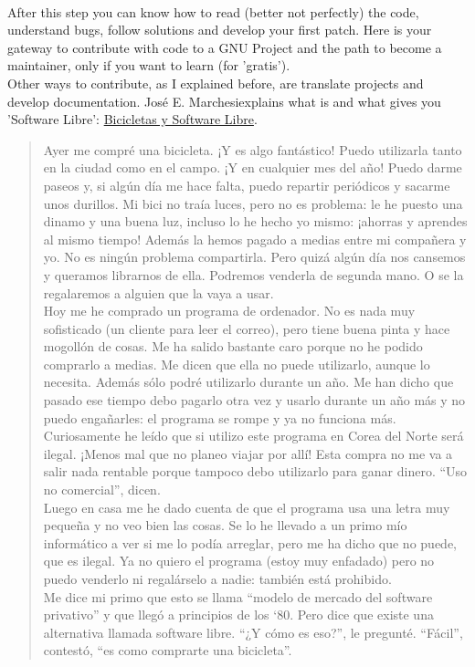 \\ After this step you can know how to read (better not perfectly) the code, understand bugs, follow solutions and develop your first patch. Here is your gateway to contribute with code to a GNU Project and the path to become a maintainer, only if you want to learn (for 'gratis').\nolinebreak
\\ Other ways to contribute, as I explained before, are translate projects and develop documentation. José E. Marchesi\nolinebreakthat explains what is and what gives you 'Software Libre': \href{http://es.gnu.org/~jemarch/bicicletas.html}{Bicicletas y Software Libre}.
\begin{quotation} Ayer me compré una bicicleta. ¡Y es algo fantástico! Puedo utilizarla tanto en la ciudad como en el campo. ¡Y en cualquier mes del año! Puedo darme paseos y, si algún día me hace falta, puedo repartir periódicos y sacarme unos durillos. Mi bici no traía luces, pero no es problema: le he puesto una dinamo y una buena luz, incluso lo he hecho yo mismo: ¡ahorras y aprendes al mismo tiempo! Además la hemos pagado a medias entre mi compañera y yo. No es ningún problema compartirla. Pero quizá algún día nos cansemos y queramos librarnos de ella. Podremos venderla de segunda mano. O se la regalaremos a alguien que la vaya a usar.
\\ Hoy me he comprado un programa de ordenador. No es nada muy sofisticado (un cliente para leer el correo), pero tiene buena pinta y hace mogollón de cosas. Me ha salido bastante caro porque no he podido comprarlo a medias. Me dicen que ella no puede utilizarlo, aunque lo necesita. Además sólo podré utilizarlo durante un año. Me han dicho que pasado ese tiempo debo pagarlo otra vez y usarlo durante un año más y no puedo engañarles: el programa se rompe y ya no funciona más. Curiosamente he leído que si utilizo este programa en Corea del Norte será ilegal. ¡Menos mal que no planeo viajar por allí! Esta compra no me va a salir nada rentable porque tampoco debo utilizarlo para ganar dinero. “Uso no comercial”, dicen.
\\ Luego en casa me he dado cuenta de que el programa usa una letra muy pequeña y no veo bien las cosas. Se lo he llevado a un primo mío informático a ver si me lo podía arreglar, pero me ha dicho que no puede, que es ilegal. Ya no quiero el programa (estoy muy enfadado) pero no puedo venderlo ni regalárselo a nadie: también está prohibido.
\\ Me dice mi primo que esto se llama “modelo de mercado del software privativo” y que llegó a principios de los ‘80. Pero dice que existe una alternativa llamada software libre. “¿Y cómo es eso?”, le pregunté. “Fácil”, contestó, “es como comprarte una bicicleta”.
\end{quotation}